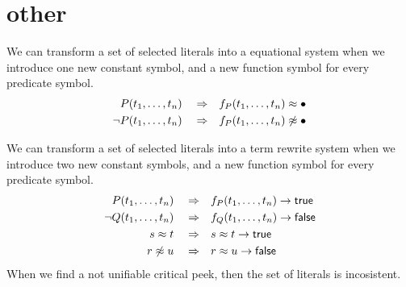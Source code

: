 
\chapter{other}


We can transform a set of selected literals into a equational system 
when we introduce one new constant symbol,
and a new function symbol for every predicate symbol.
\begin{align*}
	P(t_1,\ldots,t_n) \quad\Rightarrow&\quad f_P(t_1,\ldots,t_n) \approx \bullet \\ 
	\lnot P(t_1,\ldots,t_n) \quad\Rightarrow&\quad f_P(t_1,\ldots,t_n) \not\approx \bullet
\end{align*}


We can transform a set of selected literals into a term rewrite system 
when we introduce two new constant symbols,
and a new function symbol for every predicate symbol.
\begin{align*}
P(t_1,\ldots,t_n) \quad\Rightarrow&\quad f_P(t_1,\ldots,t_n) \rightarrow \mathsf{true} \\ 
\lnot Q(t_1,\ldots,t_n) \quad\Rightarrow&\quad f_Q(t_1,\ldots,t_n) \rightarrow \mathsf{false} \\
s \approx t \quad\Rightarrow&\quad s \approx t\rightarrow \mathsf{true} \\ 
r \not\approx u \quad\Rightarrow&\quad r \approx u\rightarrow  \mathsf{false} \\
\end{align*}
When we find a not unifiable critical peek, then the set of literals is incosistent.



